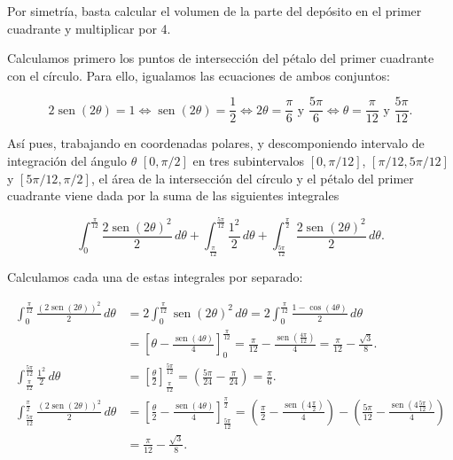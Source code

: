 \documentclass[
  spanish,
  a4paper,
]{scrreport}
\theoremstyle{definition}
\theoremstyle{remark}
\begin{document}
\begin{tcolorbox}[enhanced jigsaw, colbacktitle=quarto-callout-tip-color!10!white, opacityback=0, toptitle=1mm, title=\textcolor{quarto-callout-tip-color}{\faLightbulb}\hspace{0.5em}{Solución}, coltitle=black, opacitybacktitle=0.6, breakable, toprule=.15mm, leftrule=.75mm, titlerule=0mm, colframe=quarto-callout-tip-color-frame, left=2mm, bottomrule=.15mm, bottomtitle=1mm, arc=.35mm, rightrule=.15mm, colback=white]

Por simetría, basta calcular el volumen de la parte del depósito en el
primer cuadrante y multiplicar por 4.

Calculamos primero los puntos de intersección del pétalo del primer
cuadrante con el círculo. Para ello, igualamos las ecuaciones de ambos
conjuntos:

\[
2\operatorname{sen}(2\theta) = 1 \Leftrightarrow \operatorname{sen}(2\theta) = \frac{1}{2} \Leftrightarrow 2\theta = \frac{\pi}{6} \mbox{ y } \frac{5\pi}{6} \Leftrightarrow \theta = \frac{\pi}{12} \mbox{ y }\frac{5\pi}{12}.
\]

Así pues, trabajando en coordenadas polares, y descomponiendo intervalo
de integración del ángulo \(\theta\) \([0, \pi/2]\) en tres
subintervalos \([0,\pi/12]\), \([\pi/12, 5\pi/12]\) y
\([5\pi/12, \pi/2]\), el área de la intersección del círculo y el pétalo
del primer cuadrante viene dada por la suma de las siguientes integrales

\[
\int_0^{\frac{\pi}{12}} \frac{2\operatorname{sen}(2\theta)^2}{2}\,d\theta + \int_{\frac{\pi}{12}}^{\frac{5\pi}{12}} \frac{1^2}{2}\,d\theta + \int_{\frac{5\pi}{12}}^{\frac{\pi}{2}} \frac{2\operatorname{sen}(2\theta)^2}{2}\,d\theta.
\]

Calculamos cada una de estas integrales por separado:

\begin{align*}
\int_0^{\frac{\pi}{12}} \frac{(2\operatorname{sen}(2\theta))^2}{2}\,d\theta
&= 2\int_0^{\frac{\pi}{12}} \operatorname{sen}(2\theta)^2\,d\theta
= 2\int_0^{\frac{\pi}{12}} \frac{1 - \cos(4\theta)}{2}\,d\theta \\
&= \left[\theta - \frac{\operatorname{sen}(4\theta)}{4} \right]_0^{\frac{\pi}{12}}
= \frac{\pi}{12} - \frac{\operatorname{sen}(\frac{4\pi}{12})}{4}
= \frac{\pi}{12} - \frac{\sqrt{3}}{8}.\\
\int_{\frac{\pi}{12}}^{\frac{5\pi}{12}} \frac{1^2}{2}\,d\theta
&= \left[ \frac{\theta}{2} \right]_{\frac{\pi}{12}}^{\frac{5\pi}{12}}
= \left( \frac{5\pi}{24} - \frac{\pi}{24} \right)
= \frac{\pi}{6}.\\
\int_{\frac{5\pi}{12}}^{\frac{\pi}{2}} \frac{(2\operatorname{sen}(2\theta))^2}{2}\,d\theta 
&= \left[ \frac{\theta}{2} - \frac{\operatorname{sen}(4\theta)}{4} \right]_\frac{5\pi}{12}^{\frac{\pi}{2}} 
= \left( \frac{\pi}{2} - \frac{\operatorname{sen}(4\frac{\pi}{2})}{4} \right) - \left( \frac{5\pi}{12} - \frac{\operatorname{sen}(4\frac{5\pi}{12})}{4} \right) \\
&= \frac{\pi}{12} - \frac{\sqrt{3}}{8}.
\end{align*}


\end{tcolorbox}
\end{document}
